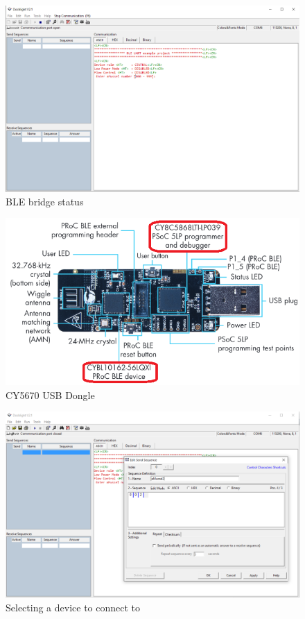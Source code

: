 \begin{figure}[htb]
    \centering
	  \includegraphics[width=\linewidth]{figures/Docklight_BLE_dongle.PNG}
	\caption{BLE bridge status}
	\label{fig:docklight_ble_bridge_status}
\end{figure}

\begin{figure}[htb]
    \centering
	  \includegraphics[width=0.6\linewidth]{figures/USB_dongle_parts.png}
	\caption{CY5670 USB Dongle}
	\label{fig:usb_dongle_parts}
\end{figure}

\begin{figure}[htb]
    \centering
	  \includegraphics[width=\linewidth]{figures/Docklight_aMussel_selection.PNG}
	\caption{Selecting a device to connect to}
	\label{fig:docklight_aMussel_selection}
\end{figure}

